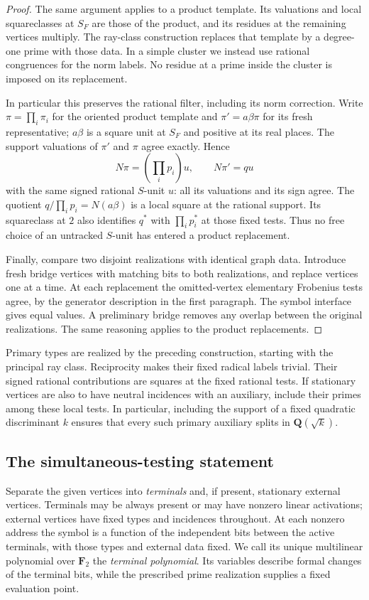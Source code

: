 \begin{proof}
The same argument applies to a product template.  Its valuations and local
squareclasses at $S_F$ are those of the product, and its residues at the
remaining vertices multiply.  The ray-class construction replaces that
template by a degree-one prime with those data.  In a simple cluster we
instead use rational congruences for the norm labels.  No residue at a prime
inside the cluster is imposed on its replacement.

In particular this preserves the rational filter, including its norm
correction.  Write $\pi=\prod_i\pi_i$ for the oriented product template
and $\pi'=a\beta\pi$ for its fresh representative; $a\beta$ is a square unit at
$S_F$ and positive at its real places.  The support valuations of $\pi'$
and $\pi$ agree exactly.  Hence
\[
 N\pi=(\prod_i p_i)u,\qquad N\pi'=q u
\]
with the same signed rational $S$-unit $u$: all its valuations and its
sign agree.  The quotient $q/\prod_i p_i=N(a\beta)$ is a local square at
the rational support.  Its squareclass at $2$ also identifies
$q^*$ with $\prod_i p_i^*$ at those fixed tests.  Thus no free choice
of an untracked $S$-unit has entered a product replacement.

Finally, compare two disjoint realizations with identical graph data.
Introduce fresh bridge vertices with matching bits to both realizations,
and replace vertices one at a time.  At each replacement the omitted-vertex
elementary Frobenius tests agree, by the generator description in the first
paragraph.  The symbol interface gives equal values.  A preliminary bridge
removes any overlap between the original realizations.  The same reasoning
applies to the product replacements.
\end{proof}

Primary types are realized by the preceding construction, starting with the principal
ray class.  Reciprocity makes their fixed radical labels trivial.  Their
signed rational contributions are squares at the fixed rational tests.
If stationary vertices are also to have neutral incidences with an
auxiliary, include their primes among these local tests.  In particular,
including the support of a fixed quadratic discriminant $k$ ensures that
every such primary auxiliary splits in $\mathbf Q(\sqrt{k})$.

\subsection{The simultaneous-testing statement}

Separate the given vertices into \emph{terminals} and, if present,
stationary external vertices.  Terminals may be always present or may
have nonzero linear activations; external vertices have fixed types and
incidences throughout.  At each nonzero address the symbol
is a function of the independent bits between the active terminals, with
those types and external data fixed.  We call its unique multilinear
polynomial over $\mathbf F_2$ the \emph{terminal polynomial}.  Its variables
describe formal changes of the terminal bits, while the prescribed prime
realization supplies a fixed evaluation point.

